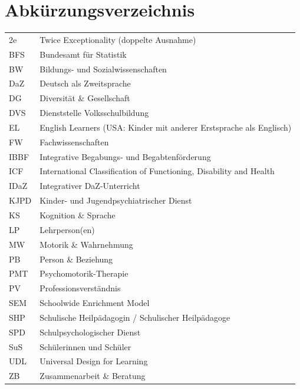 \documentclass[ngerman, a4paper]{article}
\begin{document}
\newpage
\hypersetup{pageanchor=true}
\renewcommand{\thepage}{\Roman{page}}
\tableofcontents{}





\newpage
\cleardoublepage{}
{}
\section*{Abkürzungsverzeichnis}

\begin{tabular}{@{}ll@{}}
2e    & Twice Exceptionality (doppelte Ausnahme) \\
BFS   & Bundesamt für Statistik \\
BW    & Bildungs- und Sozialwissenschaften \\
DaZ   & Deutsch als Zweitsprache \\
DG    & Diversität \& Gesellschaft \\
DVS   & Dienststelle Volksschulbildung \\
EL    & English Learners (USA: Kinder mit anderer Erstsprache als Englisch) \\
FW    & Fachwissenschaften \\
IBBF  & Integrative Begabungs- und Begabtenförderung \\
ICF   & International Classification of Functioning, Disability and Health \\
IDaZ  & Integrativer DaZ-Unterricht \\
KJPD  & Kinder- und Jugendpsychiatrischer Dienst \\
KS    & Kognition \& Sprache \\
LP    & Lehrperson(en) \\
MW    & Motorik \& Wahrnehmung \\
PB    & Person \& Beziehung \\
PMT   & Psychomotorik-Therapie \\
PV    & Professionsverständnis \\
SEM   & Schoolwide Enrichment Model \\
SHP   & Schulische Heilpädagogin / Schulischer Heilpädagoge \\
SPD   & Schulpsychologischer Dienst \\
SuS   & Schülerinnen und Schüler \\
UDL   & Universal Design for Learning \\
ZB    & Zusammenarbeit \& Beratung \\
\end{tabular}
\end{document}
